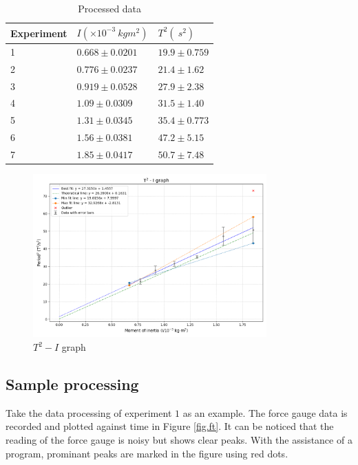 \documentclass[a4paper]{article}
\begin{document}
\begin{table}[ht]
\centering
\caption{Processed data}
\label{tab.proc}
\begin{tabular}{lll}
\hline \hline
Experiment & $I(\times 10^{-3}\SI{}{kgm^2})$ & $T^2(\SI{}{s^2})$ \\ \hline
1          & $0.668\pm 0.0201$               & $19.9\pm0.759$    \\
2          & $0.776\pm 0.0237$               & $21.4\pm1.62$     \\
3          & $0.919\pm 0.0528$               & $27.9\pm2.38$     \\
4          & $1.09\pm 0.0309$                & $31.5\pm1.40$     \\
5          & $1.31\pm 0.0345$                & $35.4\pm0.773$    \\
6          & $1.56\pm 0.0381$                & $47.2\pm5.15$     \\
7          & $1.85\pm 0.0417$                & $50.7\pm7.48$     \\ \hline \hline
\end{tabular}
\end{table}

\begin{figure}[ht]
    \centering
    \includegraphics[width = 0.8\textwidth]{grapha.png}
    \caption{$T^2 - I$ graph}
    \label{fig.processedd}
\end{figure}

\subsection{Sample processing}

Take the data processing of experiment $1$ as an example. The force gauge data is recorded and plotted against time in Figure \ref{fig.ft}. It can be noticed that the reading of the force gauge is noisy but shows clear peaks. With the assistance of a program, prominant peaks are marked in the figure using red dots.
\end{document}
